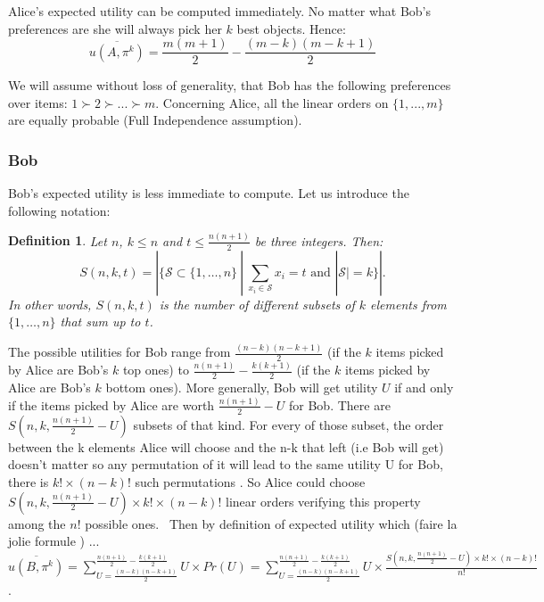 \documentclass[a4paper, english, 10pt]{article}
\newtheorem{definition}{Definition}
\begin{document}
\label{AliceTh}
Alice's expected utility can be computed immediately. No matter what
Bob's preferences are she will always pick her $k$ best objects. Hence:
\[
  \overline{u(A, \pi^k)} = \frac{m(m+1)}{2} - \frac{(m-k)(m-k+1)}{2}
\]

We will assume without loss of generality, that Bob has the following
preferences over items: $1 \succ 2 \succ ... \succ m$. Concerning
Alice, all the linear orders on $\{ 1, ..., m \}$ are equally probable
(Full Independence assumption).

\subsubsection{Bob}
\label{BobTh}

Bob's expected utility is less immediate to compute. Let us introduce the following
notation:

\begin{definition}
  Let $n$, $k \leq n$ and $t \leq \frac{n(n+1)}{2}$ be three
  integers. Then:
  \[
    S(n, k, t) = \left|\{\mathcal{S} \subset \{1, \dots, n\}\ |\ \sum_{x_i \in \mathcal{S}} x_i = t \text{ and } |\mathcal{S}| = k\}\right|.
  \]
  In other words, $S(n, k, t)$ is the number of different subsets of
  $k$ elements from $\{1, \dots, n\}$ that sum up to $t$.
\end{definition}


The possible utilities for Bob range from $\frac{(n-k)(n-k+1)}{2}$ (if
the $k$ items picked by Alice are Bob's $k$ top ones) to
$\frac{n(n+1)}{2} - \frac{k(k+1)}{2}$ (if the $k$ items picked by
Alice are Bob's $k$ bottom ones). More generally, Bob will get utility
$U$ if and only if the items picked by Alice are worth
$\frac{n(n+1)}{2} - U$ for Bob. There are 
$S(n, k, \frac{n(n+1)}{2} - U)$ subsets of that kind. 
For every of those subset, the order between the k elements Alice will choose and the n-k that left (i.e Bob will get) doesn't matter
so any permutation of it will lead to the same utility U for Bob,  there is $ k! \times (n-k)! $ such permutations .
So Alice could choose $S(n, k, \frac{n(n+1)}{2} - U) \times k! \times (n-k)!$ linear orders verifying this property among the $n!$ possible ones. \
Then by definition of expected utility which (faire la jolie formule ) ... \
 $\overline{u(B, \pi^k)} =
{\sum_{U = \frac{(n-k)(n-k+1)}{2} }^{\frac{n(n+1)}{2} - \frac{k(k+1)}{2}} U \times Pr(U)} = {\sum_{U = \frac{(n-k)(n-k+1)}{2} }^{\frac{n(n+1)}{2} - \frac{k(k+1)}{2}} U \times \frac{ S(n, k, \frac{n(n+1)}{2} - U) \times k! \times (n-k)!}{n!}} $
.
\end{document}
